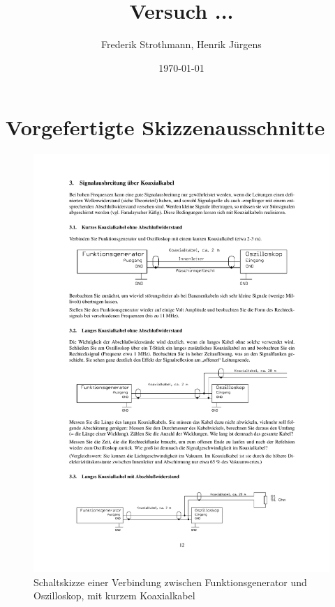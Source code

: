 \documentclass[12pt,a4paper]{article}
\title{Versuch ...\\}
\author{Frederik Strothmann, Henrik Jürgens}
\date{\today}
\begin{document}
\maketitle
\newpage
\tableofcontents
\newpage

\section*{Vorgefertigte Skizzenausschnitte}




\begin{figure}[H] 
  \centering
    \includegraphics[trim = 10mm 200mm 10mm 65mm, clip, scale = 1]{3-3_3.pdf}
  	\caption[Schaltskizze einer Verbindung zwischen Funktionsgenerator und Oszilloskop, mit kurzem Koaxialkabel]{Schaltskizze einer Verbindung zwischen Funktionsgenerator und Oszilloskop, mit kurzem Koaxialkabel\footnotemark}
  \label{fig:3.1}
\end{figure}
\end{document}
